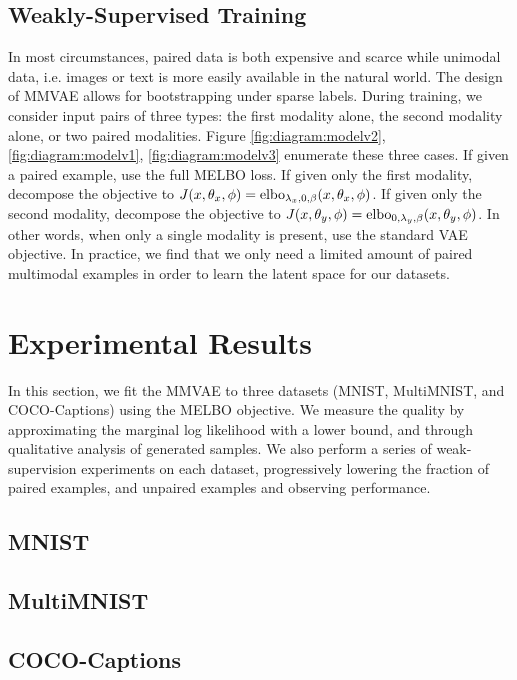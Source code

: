 \documentclass{article}
\begin{document}
\subsection{Weakly-Supervised Training}
In most circumstances, paired data is both expensive and scarce while unimodal data, i.e. images or text is more easily available in the natural world. The design of MMVAE allows for bootstrapping under sparse labels. During training, we consider input pairs of three types: the first modality alone, the second modality alone, or two paired modalities. Figure \ref{fig:diagram:modelv2}, \ref{fig:diagram:modelv1}, \ref{fig:diagram:modelv3} enumerate these three cases. If given a paired example, use the full MELBO loss. If given only the first modality, decompose the objective to $J(x, \theta_{x}, \phi) = \textup{elbo}_{\lambda_{x}, 0, \beta}(x, \theta_{x}, \phi)$. If given only the second modality, decompose the objective to $J(x, \theta_{y}, \phi) = \textup{elbo}_{0, \lambda_{y}, \beta}(x, \theta_{y}, \phi)$. In other words, when only a single modality is present, use the standard VAE objective. In practice, we find that we only need a limited amount of paired multimodal examples in order to learn the latent space for our datasets.

\section{Experimental Results}

In this section, we fit the MMVAE to three datasets (MNIST, MultiMNIST, and COCO-Captions) using the MELBO objective. We measure the quality by approximating the marginal log likelihood with a lower bound, and through qualitative analysis of generated samples. We also perform a series of weak-supervision experiments on each dataset, progressively lowering the fraction of paired examples, and unpaired examples and observing performance. 

\subsection{MNIST}
\subsection{MultiMNIST}
\subsection{COCO-Captions}


{\small
\linespread{1}

}
\end{document}
